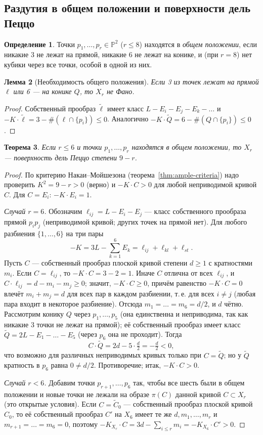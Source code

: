 \documentclass[11pt,a4paper]{article}
\theoremstyle{plain}
\newtheorem{theorem}{Теорема}[section]
\newtheorem{lemma}[theorem]{Лемма}
\theoremstyle{definition}
\newtheorem{definition}[theorem]{Определение}
\theoremstyle{remark}
\newcommand{\PP}{\mathbb{P}}
\begin{document}
\subsection{Раздутия в общем положении и поверхности дель Пеццо}

\begin{definition}
Точки $p_1,\dots,p_r\in\PP^2$ ($r\le8$) находятся в \emph{общем положении}, если никакие 3 не лежат на прямой,
никакие 6 не лежат на конике, и (при $r=8$) нет кубики через все точки, особой в одной из них.
\end{definition}

\begin{lemma}[Необходимость общего положения]
Если 3 из точек лежат на прямой $\ell$ или 6 --- на конике $Q$, то $X_r$ не Фано.
\end{lemma}
\begin{proof}
Собственный прообраз $\tilde\ell$ имеет класс $L-E_i-E_j-E_k-\dots$ и
$-K\cdot\tilde\ell=3-\#(\ell\cap\{p_i\})\le0$. Аналогично $-K\cdot\tilde Q=6-\#(Q\cap\{p_i\})\le0$.
\end{proof}

\begin{theorem}\label{thm:dP-blowup}
Если $r\le6$ и точки $p_1,\dots,p_r$ находятся в общем положении, то $X_r$ --- поверхность дель Пеццо степени
$9-r$.
\end{theorem}
\begin{proof}
По критерию Накаи--Мойшезона (теорема~\ref{thm:ample-criteria}) надо проверить $K^2=9-r>0$ (верно) и
$-K\cdot C>0$ для любой неприводимой кривой $C$. Для $C=E_i$: $-K\cdot E_i=1$.

\emph{Случай $r=6$.} Обозначим $\ell_{ij}=L-E_i-E_j$ --- класс собственного прообраза прямой $p_ip_j$
(неприводимой кривой; других точек на прямой нет). Для любого разбиения $\{1,\dots,6\}$ на три пары
\[
-K=3L-\sum_{k=1}^6E_k=\ell_{ij}+\ell_{kl}+\ell_{st}.
\]
Пусть $C$ --- собственный прообраз плоской кривой степени $d\ge1$ с кратностями $m_i$. Если $C=\ell_{ij}$, то
$-K\cdot C=3-2=1$. Иначе $C$ отлична от всех $\ell_{ij}$, и $C\cdot\ell_{ij}=d-m_i-m_j\ge0$; значит,
$-K\cdot C\ge0$, причём равенство $-K\cdot C=0$ влечёт $m_i+m_j=d$ для всех пар в каждом разбиении, т.\,е. для
всех $i\ne j$ (любая пара входит в некоторое разбиение). Отсюда $m_1=\dots=m_6=d/2$, и $d$ чётно. Рассмотрим
конику $Q$ через $p_1,\dots,p_5$ (она единственна и неприводима, так как никакие 3 точки не лежат на прямой);
её собственный прообраз имеет класс $\tilde Q=2L-E_1-\dots-E_5$ (через $p_6$ она не проходит). Тогда
\[
C\cdot\tilde Q=2d-5\cdot\tfrac d2=-\tfrac d2<0,
\]
что возможно для различных неприводимых кривых только при $C=\tilde Q$; но у $\tilde Q$ кратность в $p_6$ равна
$0\ne d/2$. Противоречие; итак, $-K\cdot C>0$.

\emph{Случай $r<6$.} Добавим точки $p_{r+1},\dots,p_6$ так, чтобы все шесть были в общем положении и новые точки
не лежали на образе $\pi(C)$ данной кривой $C\subset X_r$ (это открытые условия). Если $C=\tilde C_0$ ---
собственный прообраз плоской кривой $C_0$, то её собственный прообраз $C'$ на $X_6$ имеет те же $d,m_1,\dots,m_r$ и
$m_{r+1}=\dots=m_6=0$, поэтому $-K_{X_r}\cdot C=3d-\sum_{i\le r}m_i=-K_{X_6}\cdot C'>0$.
\end{proof}
\end{document}
